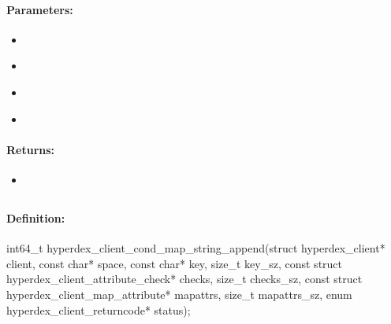 \paragraph{Parameters:}
\begin{itemize}[noitemsep]
\item {}\\

\item {}\\

\item {}\\

\item {}\\

\end{itemize}

\paragraph{Returns:}
\begin{itemize}[noitemsep]
\item {}\\

\end{itemize}

\pagebreak
\subsection{}
\label{api:c:cond_map_string_append}


\paragraph{Definition:}
\begin{ccode}
int64_t hyperdex_client_cond_map_string_append(struct hyperdex_client* client,
        const char* space,
        const char* key, size_t key_sz,
        const struct hyperdex_client_attribute_check* checks, size_t checks_sz,
        const struct hyperdex_client_map_attribute* mapattrs, size_t mapattrs_sz,
        enum hyperdex_client_returncode* status);
\end{ccode}


